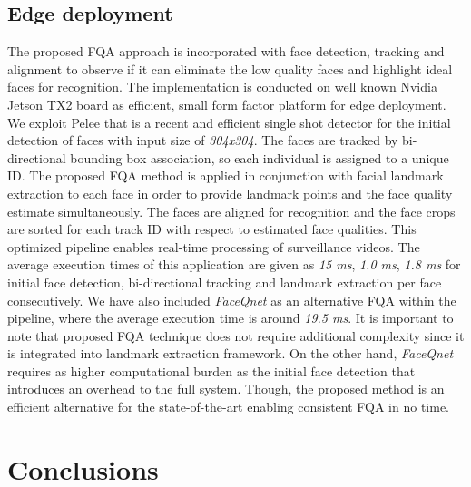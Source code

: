 \documentclass[runningheads]{llncs}
\begin{document}
\subsection{Edge deployment}
The proposed FQA approach is incorporated with face detection, tracking and alignment to observe if it can eliminate the low quality faces and highlight ideal faces for recognition. The implementation is conducted on well known Nvidia Jetson TX2 board as efficient, small form factor platform for edge deployment. We exploit Pelee \cite{NIPS2018_Pelee} that is a recent and efficient single shot detector for the initial detection of faces with input size of \textit{304x304}. The faces are tracked by bi-directional bounding box association, so each individual is assigned to a unique ID. The proposed FQA method is applied in conjunction with facial landmark extraction to each face in order to provide landmark points and the face quality estimate simultaneously. 
The faces are aligned for recognition and the face crops are sorted for each track ID with respect to estimated face qualities. This optimized pipeline enables real-time processing of surveillance videos. The average execution times of this application are given as \textit{15 ms}, \textit{1.0 ms}, \textit{1.8 ms} for initial face detection, bi-directional tracking and landmark extraction per face consecutively. We have also included \textit{FaceQnet} as an alternative FQA within the pipeline, where the average execution time is around \textit{19.5 ms}. It is important to note that proposed FQA technique does not require additional complexity since it is integrated into landmark extraction framework. On the other hand, \textit{FaceQnet} requires as higher computational burden as the initial face detection that introduces an overhead to the full system. Though, the proposed method is an efficient alternative for the state-of-the-art enabling consistent FQA in no time.  

\section{Conclusions}
\end{document}
